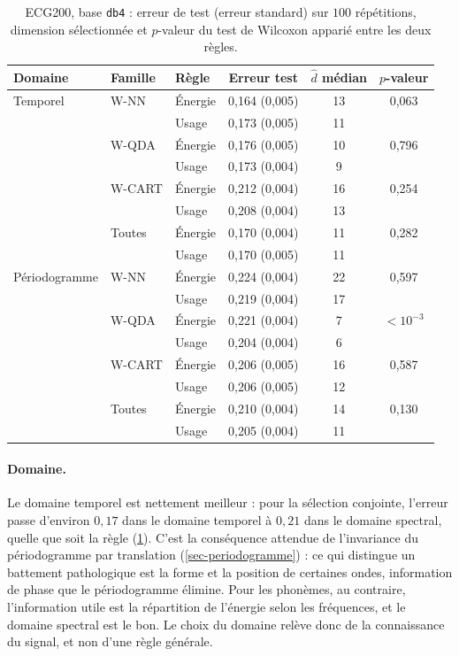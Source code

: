 \begin{table}[ht]
\centering
\small
\begin{tabular}{@{}lllccc@{}}
\toprule
Domaine & Famille & Règle & Erreur test & $\hat d$ médian & $p$-valeur \\
\midrule
Temporel & W-NN & Énergie & 0{,}164 (0{,}005) & 13 & 0{,}063 \\
 &  & Usage & 0{,}173 (0{,}005) & 11 &  \\
 & W-QDA & Énergie & 0{,}176 (0{,}005) & 10 & 0{,}796 \\
 &  & Usage & 0{,}173 (0{,}004) & 9 &  \\
 & W-CART & Énergie & 0{,}212 (0{,}004) & 16 & 0{,}254 \\
 &  & Usage & 0{,}208 (0{,}004) & 13 &  \\
 & Toutes & Énergie & 0{,}170 (0{,}004) & 11 & 0{,}282 \\
 &  & Usage & 0{,}170 (0{,}005) & 11 &  \\
\midrule
Périodogramme & W-NN & Énergie & 0{,}224 (0{,}004) & 22 & 0{,}597 \\
 &  & Usage & 0{,}219 (0{,}004) & 17 &  \\
 & W-QDA & Énergie & 0{,}221 (0{,}004) & 7 & $<10^{-3}$ \\
 &  & Usage & 0{,}204 (0{,}004) & 6 &  \\
 & W-CART & Énergie & 0{,}206 (0{,}005) & 16 & 0{,}587 \\
 &  & Usage & 0{,}206 (0{,}005) & 12 &  \\
 & Toutes & Énergie & 0{,}210 (0{,}004) & 14 & 0{,}130 \\
 &  & Usage & 0{,}205 (0{,}004) & 11 &  \\
\bottomrule
\end{tabular}

\caption{ECG200, base \texttt{db4} : erreur de test (erreur standard) sur $100$ répétitions, dimension sélectionnée et $p$-valeur du test de Wilcoxon apparié entre les deux règles.}
\label{tab-ecg}
\end{table}

\paragraph{Domaine.} Le domaine temporel est nettement meilleur : pour la sélection conjointe, l'erreur passe d'environ $0{,}17$ dans le domaine temporel à $0{,}21$ dans le domaine spectral, quelle que soit la règle (\cref{tab-ecg}). C'est la conséquence attendue de l'invariance du périodogramme par translation (\cref{sec-periodogramme}) : ce qui distingue un battement pathologique est la forme et la position de certaines ondes, information de phase que le périodogramme élimine. Pour les phonèmes, au contraire, l'information utile est la répartition de l'énergie selon les fréquences, et le domaine spectral est le bon. Le choix du domaine relève donc de la connaissance du signal, et non d'une règle générale.


